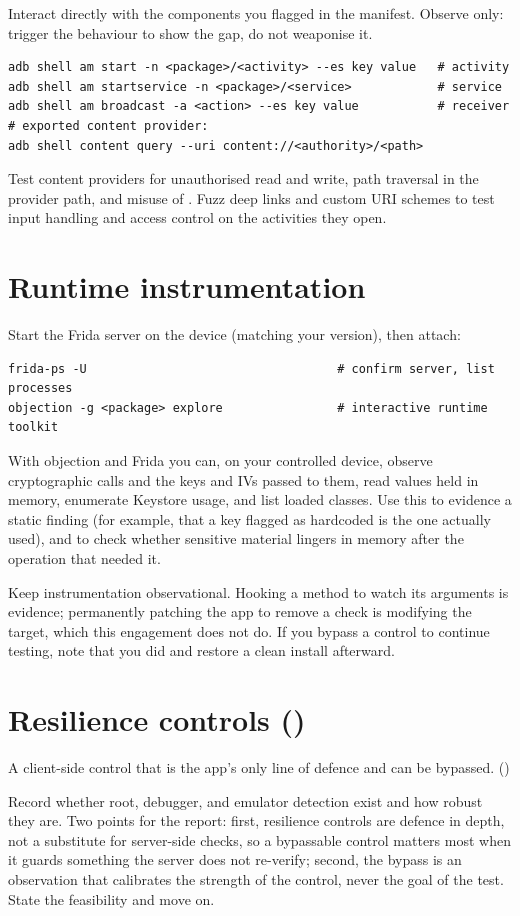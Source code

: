 Interact directly with the components you flagged in the manifest. Observe only: trigger the behaviour to show the gap, do not weaponise it.

\begin{lstlisting}
adb shell am start -n <package>/<activity> --es key value   # activity
adb shell am startservice -n <package>/<service>            # service
adb shell am broadcast -a <action> --es key value           # receiver
# exported content provider:
adb shell content query --uri content://<authority>/<path>
\end{lstlisting}

Test content providers for unauthorised read and write, path traversal in the provider path, and misuse of . Fuzz deep links and custom URI schemes to test input handling and access control on the activities they open.

\section{Runtime instrumentation}
Start the Frida server on the device (matching your  version), then attach:

\begin{lstlisting}
frida-ps -U                                   # confirm server, list processes
objection -g <package> explore                # interactive runtime toolkit
\end{lstlisting}

With objection and Frida you can, on your controlled device, observe cryptographic calls and the keys and IVs passed to them, read values held in memory, enumerate Keystore usage, and list loaded classes. Use this to evidence a static finding (for example, that a key flagged as hardcoded is the one actually used), and to check whether sensitive material lingers in memory after the operation that needed it.

\begin{trap}
Keep instrumentation observational. Hooking a method to watch its arguments is evidence; permanently patching the app to remove a check is modifying the target, which this engagement does not do. If you bypass a control to continue testing, note that you did and restore a clean install afterward.
\end{trap}

\section{Resilience controls ()}
\begin{findingbox}
A client-side control that is the app's only line of defence and can be bypassed. ()
\end{findingbox}
Record whether root, debugger, and emulator detection exist and how robust they are. Two points for the report: first, resilience controls are defence in depth, not a substitute for server-side checks, so a bypassable control matters most when it guards something the server does not re-verify; second, the bypass is an observation that calibrates the strength of the control, never the goal of the test. State the feasibility and move on.


